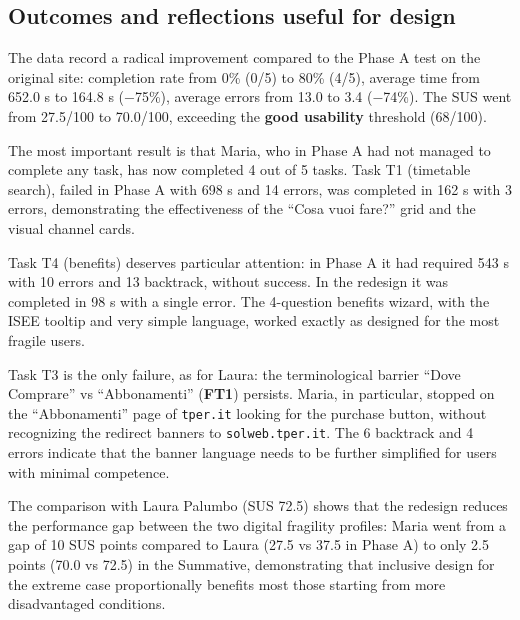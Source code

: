 ﻿\documentclass[11pt,a4paper]{article}
\begin{document}
\subsection*{Outcomes and reflections useful for design}
\begin{tcolorbox}[base]
The data record a radical improvement compared to the Phase A
test on the original site: completion rate from 0\%
(0/5) to 80\% (4/5), average time from 652.0 s to 164.8 s
($-$75\%), average errors from 13.0 to 3.4 ($-$74\%). The SUS went
from 27.5/100 to 70.0/100, exceeding the \textbf{good usability} threshold
(68/100).

\medskip

The most important result is that Maria, who in Phase A had not
managed to complete any task, has now completed 4 out of 5 tasks.
Task T1 (timetable search), failed in Phase A with 698 s and 14
errors, was completed in 162 s with 3 errors, demonstrating
the effectiveness of the ``Cosa vuoi fare?'' grid and the visual
channel cards.

\medskip

Task T4 (benefits) deserves particular attention: in
Phase A it had required 543 s with 10 errors and 13 backtrack,
without success. In the redesign it was completed in 98 s with a single
error. The 4-question benefits wizard, with the ISEE
tooltip and very simple language, worked exactly
as designed for the most fragile users.

\medskip

Task T3 is the only failure, as for Laura: the terminological
barrier ``Dove Comprare'' vs ``Abbonamenti'' (\textbf{FT1})
persists. Maria, in particular, stopped on the
``Abbonamenti'' page of \texttt{tper.it} looking for the
purchase button, without recognizing the redirect banners to
\texttt{solweb.tper.it}. The 6 backtrack and 4 errors indicate
that the banner language needs to be further simplified for
users with minimal competence.

\medskip

The comparison with Laura Palumbo (SUS 72.5) shows that the redesign
reduces the performance gap between the two digital fragility
profiles: Maria went from a gap of 10 SUS points compared
to Laura (27.5 vs 37.5 in Phase A) to only 2.5 points (70.0 vs 72.5)
in the Summative, demonstrating that inclusive design for the extreme
case proportionally benefits most those starting from
more disadvantaged conditions.
\end{tcolorbox}

\end{document}
